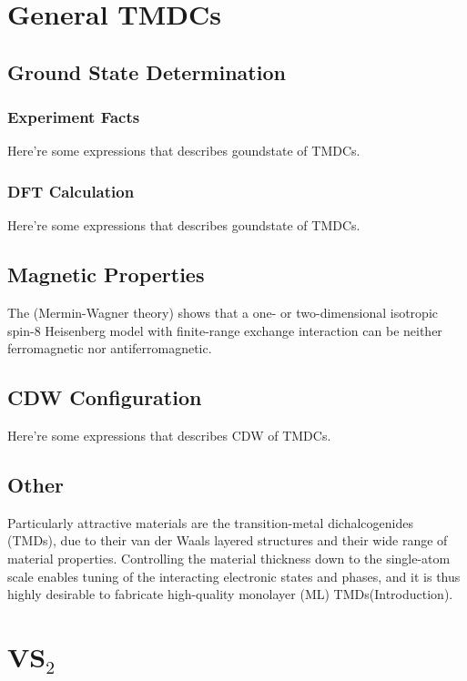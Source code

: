 \setchapterpreamble[u]{\margintoc}
\chapter{General TMDCs}

\section{Ground State Determination}
\subsection{Experiment Facts}
Here're some expressions that describes goundstate of TMDCs.

\subsection{DFT Calculation}
Here're some expressions that describes goundstate of TMDCs.

\section{Magnetic Properties}
The (Mermin-Wagner theory) shows that a one- or two-dimensional isotropic spin-8 Heisenberg model with finite-range exchange interaction can be neither ferromagnetic nor antiferromagnetic\cite{PhysRevLett.17.1133}.

\section{CDW Configuration}
Here're some expressions that describes CDW of TMDCs.

\section{Other}
Particularly attractive materials are the transition-metal dichalcogenides (TMDs), due to their van der Waals layered structures and their wide range of material properties. Controlling the material thickness down to the single-atom scale enables tuning of the interacting electronic states and phases, and it is thus highly desirable to fabricate high-quality monolayer (ML) TMDs\cite{doi:10.1021/acsnano.9b02996}(Introduction).

\chapter{VS$_2$}

